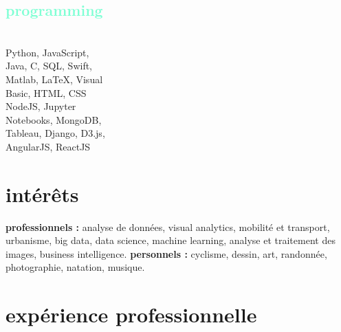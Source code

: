 \documentclass[francais]{cv-style}          %
\begin{document}
\begin{aside}
\section{\textcolor{aquamarine}{programming}}\\
\vspace{0.2cm}
{Python, JavaScript,\\
\vspace{0.1cm}
Java, C, SQL, Swift,\\
\vspace{0.1cm}
Matlab, \LaTeX{}, Visual\\
\vspace{0.1cm}
Basic, HTML, CSS}\\
\vspace{0.5cm}
{NodeJS, Jupyter\\
\vspace{0.1cm}
Notebooks, MongoDB,\\
\vspace{0.1cm}
Tableau, Django, D3.js,\\
\vspace{0.1cm}
AngularJS, ReactJS}\\
%
\end{aside}
\section{intérêts}
  \vspace{-0.2cm}
\textbf{professionnels :} analyse de données, visual analytics, mobilité et transport, urbanisme, big data, data science, machine learning, analyse et traitement des images, business intelligence. \textbf{personnels :} cyclisme, dessin, art, randonnée, photographie, natation, musique.


\section{expérience professionnelle }
\end{document}
